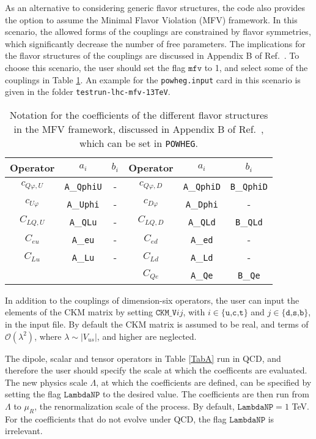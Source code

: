 \documentclass[paper]{JHEP3}
\begin{document}
As an alternative to considering generic flavor structures, the code also provides the option to assume the Minimal Flavor Violation (MFV) framework. In this scenario, the allowed forms of the couplings are constrained by  flavor symmetries, which significantly decrease the number of free parameters. 
The implications for the flavor structures of the couplings are discussed in Appendix B of Ref.\ \cite{Alioli:2018ljm}.
To choose this scenario, the user should set the flag $\texttt{mfv}$ to 1, and select some of the couplings in Table \ref{tab:mfv}.
An example for the \texttt{powheg.input}  card in this scenario is given in the folder \texttt{testrun-lhc-mfv-13TeV}.

\begin{table}
\center
\begin{tabular}{||c|c  c|| c | c c || }
\hline
	Operator    & $a_i$ & $b_i$ & Operator & $a_i$ & $b_i$\\\hline
$	c_{Q\varphi,U}$ & \texttt{A}\_\texttt{QphiU} & - &
$	c_{Q\varphi,D}$ & \texttt{A}\_\texttt{QphiD} & \texttt{B}\_\texttt{QphiD}  \\
$	c_{U\varphi }$  & \texttt{A}\_\texttt{Uphi} &-&
$	c_{D\varphi }$  & \texttt{A}\_\texttt{Dphi}&- \\
$	C_{LQ,U}$   & \texttt{A}\_\texttt{QLu} &-&
$	C_{LQ,D}$   & \texttt{A}\_\texttt{QLd}& \texttt{B}\_\texttt{QLd} \\
$	C_{eu}$     & \texttt{A}\_\texttt{eu}&- &
$	C_{ed}$     &\texttt{A}\_\texttt{ed}&- \\
$	C_{Lu}$     &\texttt{A}\_\texttt{Lu}& -&
$	C_{Ld}$     &\texttt{A}\_\texttt{Ld}& -\\
& & & 
$	C_{Qe}$& \texttt{A}\_\texttt{Qe}& \texttt{B}\_\texttt{Qe} \\
\hline
\end{tabular}
\caption{Notation for the coefficients of the different flavor structures in the MFV framework, discussed in Appendix B of Ref.\ \cite{Alioli:2018ljm}, which can be set in \texttt{POWHEG}.}\label{tab:mfv}
\end{table}

In addition to the couplings of dimension-six operators, the user can input the elements of the CKM matrix by setting  $\texttt{CKM\_V}ij$, with $i \in \{\texttt{u,c,t}\}$ and $j \in \{ \texttt{d,s,b}\}$,
in the input file. By default the CKM matrix is assumed to be real, and terms of $\mathcal O(\lambda^2)$, where $\lambda \sim |V_{us}|$, and higher are neglected. 

The dipole, scalar and tensor operators in Table \ref{TabA} run in QCD, and therefore the user should specify the scale at which the coefficents are evaluated.
The new physics scale $\Lambda$, at which the coefficients are defined, can be specified 
by setting the flag $\texttt{LambdaNP}$ to the desired value. 
The coefficients are then run from $\Lambda$ to $\mu_R$, the renormalization scale of the  process. By default, $\texttt{LambdaNP} = 1$ TeV.
For the coefficients that do not evolve under QCD, the flag $\texttt{LambdaNP}$ is irrelevant.
\end{document}
